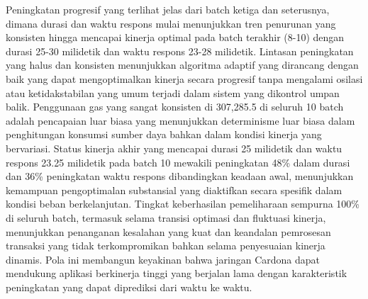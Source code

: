 Peningkatan progresif yang terlihat jelas dari batch ketiga dan seterusnya, dimana durasi dan waktu respons mulai menunjukkan tren penurunan yang konsisten hingga mencapai kinerja optimal pada batch terakhir (8-10) dengan durasi 25-30 milidetik dan waktu respons 23-28 milidetik. Lintasan peningkatan yang halus dan konsisten menunjukkan algoritma adaptif yang dirancang dengan baik yang dapat mengoptimalkan kinerja secara progresif tanpa mengalami osilasi atau ketidakstabilan yang umum terjadi dalam sistem yang dikontrol umpan balik. Penggunaan gas yang sangat konsisten di 307,285.5 di seluruh 10 batch adalah pencapaian luar biasa yang menunjukkan determinisme luar biasa dalam penghitungan konsumsi sumber daya bahkan dalam kondisi kinerja yang bervariasi.
Status kinerja akhir yang mencapai durasi 25 milidetik dan waktu respons 23.25 milidetik pada batch 10 mewakili peningkatan 48\% dalam durasi dan 36\% peningkatan waktu respons dibandingkan keadaan awal, menunjukkan kemampuan pengoptimalan substansial yang diaktifkan secara spesifik dalam kondisi beban berkelanjutan. Tingkat keberhasilan pemeliharaan sempurna 100\% di seluruh batch, termasuk selama transisi optimasi dan fluktuasi kinerja, menunjukkan penanganan kesalahan yang kuat dan keandalan pemrosesan transaksi yang tidak terkompromikan bahkan selama penyesuaian kinerja dinamis. Pola ini membangun keyakinan bahwa jaringan Cardona dapat mendukung aplikasi berkinerja tinggi yang berjalan lama dengan karakteristik peningkatan yang dapat diprediksi dari waktu ke waktu.

